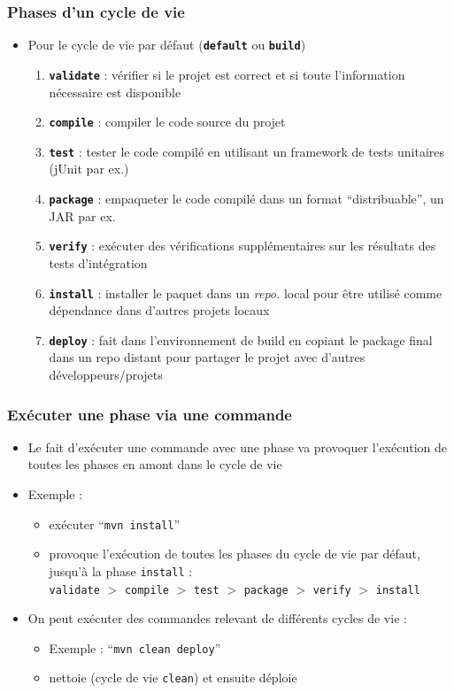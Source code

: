 \documentclass{beamer}
\begin{document}
\begin{frame}[fragile]
  \frametitle{Phases d'un cycle de vie}
\begin{itemize}
\item  Pour le cycle de vie par défaut (\textbf{\texttt{default}} ou \textbf{\texttt{build}})
  \begin{enumerate}
  \item \textbf{\texttt{validate}} : vérifier si le projet est correct et si
    toute l'information nécessaire est disponible
  \item \textbf{\texttt{compile}} : compiler le code source du projet
  \item \textbf{\texttt{test}} : tester le code compilé en utilisant un
    framework de tests unitaires (jUnit par ex.)
  \item \textbf{\texttt{package}} : empaqueter le code compilé dans un format
    ``distribuable'', un JAR par ex.
  \item \textbf{\texttt{verify}} : exécuter des vérifications supplémentaires sur
    les résultats des tests d'intégration
  \item \textbf{\texttt{install}} : installer le paquet dans un \textit{repo.}
    local pour être utilisé comme dépendance dans d'autres projets
    locaux
  \item \textbf{\texttt{deploy}} : fait dans l'environnement de build en
    copiant le package final dans un repo distant pour partager le
    projet avec d'autres développeurs/projets
  \end{enumerate}
\end{itemize}
\end{frame}

\begin{frame}[fragile]
  \frametitle{Exécuter une phase via une commande}
\begin{itemize}
\item Le fait d'exécuter une commande avec une phase va provoquer
  l'exécution de toutes les phases en amont dans le cycle de vie
\item Exemple :
  \begin{itemize}
  \item exécuter ``\texttt{mvn install}''
  \item provoque l'exécution de toutes les phases du cycle de vie par
    défaut, jusqu'à la phase \texttt{install} :\\ \texttt{validate} $>$
    \texttt{compile} $>$ \texttt{test} $>$ \texttt{package} $>$ \texttt{verify}
    $>$ \texttt{install}
  \end{itemize}
\item On peut exécuter des commandes relevant de différents cycles de vie :
  \begin{itemize}
  \item Exemple : ``\texttt{mvn clean deploy}''
  \item nettoie (cycle de vie \texttt{clean}) et ensuite déploie
  \end{itemize}
\end{itemize}
\end{frame}
\end{document}
